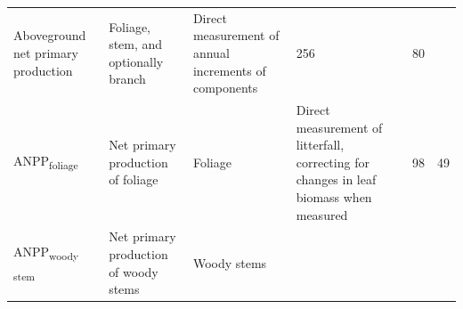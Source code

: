 \documentclass[]{article}
\begin{document}
\begin{longtable}[]{@{}llllll@{}}
\begin{minipage}[t]{0.19\columnwidth}
Aboveground net primary production\strut
\end{minipage} & \begin{minipage}[t]{0.13\columnwidth}\raggedright\strut
Foliage, stem, and optionally branch\strut
\end{minipage} & \begin{minipage}[t]{0.23\columnwidth}\raggedright\strut
Direct measurement of annual increments of components\strut
\end{minipage} & \begin{minipage}[t]{0.07\columnwidth}\raggedright\strut
256\strut
\end{minipage} & \begin{minipage}[t]{0.07\columnwidth}\raggedright\strut
80\strut
\end{minipage}\tabularnewline
\begin{minipage}[t]{0.14\columnwidth}\raggedright\strut
ANPP\textsubscript{foliage}\strut
\end{minipage} & \begin{minipage}[t]{0.19\columnwidth}\raggedright\strut
Net primary production of foliage\strut
\end{minipage} & \begin{minipage}[t]{0.13\columnwidth}\raggedright\strut
Foliage\strut
\end{minipage} & \begin{minipage}[t]{0.23\columnwidth}\raggedright\strut
Direct measurement of litterfall, correcting for changes in leaf biomass
when measured\strut
\end{minipage} & \begin{minipage}[t]{0.07\columnwidth}\raggedright\strut
98\strut
\end{minipage} & \begin{minipage}[t]{0.07\columnwidth}\raggedright\strut
49\strut
\end{minipage}\tabularnewline
\begin{minipage}[t]{0.14\columnwidth}\raggedright\strut
ANPP\textsubscript{woody} \textsubscript{stem}\strut
\end{minipage} & \begin{minipage}[t]{0.19\columnwidth}\raggedright\strut
Net primary production of woody stems\strut
\end{minipage} & \begin{minipage}[t]{0.13\columnwidth}\raggedright\strut
Woody stems\strut
\end{minipage} & \begin{minipage}[t]{0.23\columnwidth}\raggedright\strut

\end{minipage}
\end{longtable}
\end{document}
